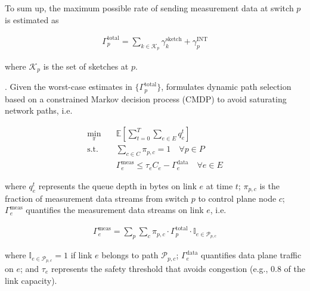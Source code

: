 To sum up, the maximum possible rate of sending measurement data at switch $p$ is estimated as

\vspace{-4pt}
{\footnotesize
\begin{align}
\Gamma_p^{\text{total}} = \sum_{k \in \mathcal{K}_p} \gamma_k^{\text{sketch}} + \gamma_p^{\text{INT}}
\end{align}}

\noindent where $\mathcal{K}_p$ is the set of sketches at $p$. 


. Given the worst-case estimates in $\{\Gamma_p^{\text{total}}\}$, \sysname formulates dynamic path selection based on a constrained Markov decision process (CMDP) to avoid saturating network paths, i.e.

\vspace{-4pt}
{\footnotesize
\begin{align}
\min_{\pi}  & \quad \mathbb{E}\left[\sum_{t=0}^T \sum_{e \in E} q_e^t \right] \\
\text{s.t.} & \quad \sum_{c \in C} \pi_{p,c} = 1 \quad \forall p \in P  \\
            & \quad \Gamma_e^{\text{meas}} \leq \tau_e C_e - \Gamma_e^{\text{data}} \quad \forall e \in E 
\end{align}}

\noindent where $q_e^t$ represents the queue depth in bytes on link $e$ at time $t$; $\pi_{p,c}$ is the fraction of measurement data streams from switch $p$ to control plane node $c$; $\Gamma_e^{\text{meas}}$ quantifies the measurement data streams on link $e$, i.e. 

\vspace{-4pt}
{\footnotesize
\begin{align}
    \Gamma_e^{\text{meas}} = \sum_{p} \sum_{c} \pi_{p,c} \cdot \Gamma_p^{\text{total}} \cdot \mathbb{I}_{e \in \mathcal{P}_{p,c}}
\end{align}}

\noindent where $\mathbb{I}_{e \in \mathcal{P}_{p,c}}=1$ if link $e$ belongs to path $\mathcal{P}_{p,c}$; $\Gamma_e^{\text{data}}$ quantifies data plane traffic on $e$; and $\tau_e$ represents the safety threshold that avoids congestion (e.g., 0.8 of the link capacity).

